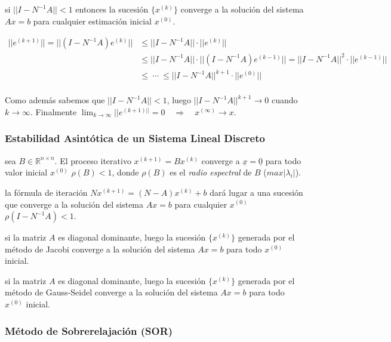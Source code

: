 \Teorema si \(||I - N^{-1} A|| < 1\) entonces la sucesión
\(\{x^{(k)}\}\) converge a la solución del sistema \(Ax = b\) para
cualquier estimación inicial \(x^{(0)}\).

\Demostracion

\begin{align*}
|| e^{(k+1)} || = || (I - N^{-1} A) e^{(k)} ||
& \leq || I - N^{-1} A || \cdot || e^{(k)} || \\
& \leq || I - N^{-1} A || \cdot || (I - N^{-1} A) e^{(k-1)} ||
= || I - N^{-1} A ||^2 \cdot || e^{(k-1)} || \\
& \leq \ \cdots\ \leq || I - N^{-1} A ||^{k+1} \cdot || e^{(0)} || \\
\end{align*}

Como además sabemos que \(|| I - N^{-1} A || < 1\), luego
\(||I - N^{-1} A||^{k+1} \rightarrow 0\) cuando
\(k \rightarrow \infty\). Finalmente
\(\ensuremath{\lim_{k \to \infty} ||e^{(k+1)||}} = 0 \ensuremath{\quad\Longrightarrow\quad}x^{(\infty)} \rightarrow x\).

\hypertarget{estabilidad-asintuxf3tica-de-un-sistema-lineal-discreto}{%
\subsubsection{Estabilidad Asintótica de un Sistema Lineal
Discreto}\label{estabilidad-asintuxf3tica-de-un-sistema-lineal-discreto}}

\Teorema sea \(B \in \ensuremath{\mathbb{R}}^{n \times n}\). El proceso
iterativo \(x^{(k+1)} = Bx^{(k)}\) converge a
\(\underline{x} = \underline{0}\) para todo valor inicial \(x^{(0)}\)
\sii \(\rho(B) < 1\), donde \(\rho(B)\) es el \emph{radio espectral} de
\(B\) (\(max |\lambda_i|\)).

\Corolario la fórmula de iteración \(N x^{(k+1)} = (N-A)x^{(k)} + b\)
dará lugar a una sucesión que converge a la solución del sistema
\(Ax = b\) para cualquier \(x^{(0)}\) \sii \(\rho(I - N^{-1} A) < 1\).

\Teorema si la matriz \(A\) es diagonal dominante, luego la sucesión
\(\{x^{(k)}\}\) generada por el método de Jacobi converge a la solución
del sistema \(Ax = b\) para todo \(x^{(0)}\) inicial.

\Teorema si la matriz \(A\) es diagonal dominante, luego la sucesión
\(\{x^{(k)}\}\) generada por el método de Gauss-Seidel converge a la
solución del sistema \(Ax = b\) para todo \(x^{(0)}\) inicial.

\hypertarget{muxe9todo-de-sobrerelajaciuxf3n-sor}{%
\subsubsection{Método de Sobrerelajación
(SOR)}\label{muxe9todo-de-sobrerelajaciuxf3n-sor}}

